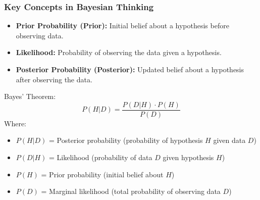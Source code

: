 \documentclass[aspectratio=169]{beamer}
\begin{document}
\begin{frame}[fragile]
    \frametitle{Key Concepts in Bayesian Thinking}
    \begin{itemize}
        \item \textbf{Prior Probability (Prior):} 
            Initial belief about a hypothesis before observing data.
        \item \textbf{Likelihood:} 
            Probability of observing the data given a hypothesis.
        \item \textbf{Posterior Probability (Posterior):} 
            Updated belief about a hypothesis after observing the data.
    \end{itemize}
    
    \begin{block}{Bayes' Theorem:}
    \begin{equation}
        P(H | D) = \frac{P(D | H) \cdot P(H)}{P(D)}
    \end{equation}
    Where:
    \begin{itemize}
        \item $P(H | D)$ = Posterior probability (probability of hypothesis $H$ given data $D$)
        \item $P(D | H)$ = Likelihood (probability of data $D$ given hypothesis $H$)
        \item $P(H)$ = Prior probability (initial belief about $H$)
        \item $P(D)$ = Marginal likelihood (total probability of observing data $D$)
    \end{itemize}
    \end{block}
\end{frame}
\end{document}
